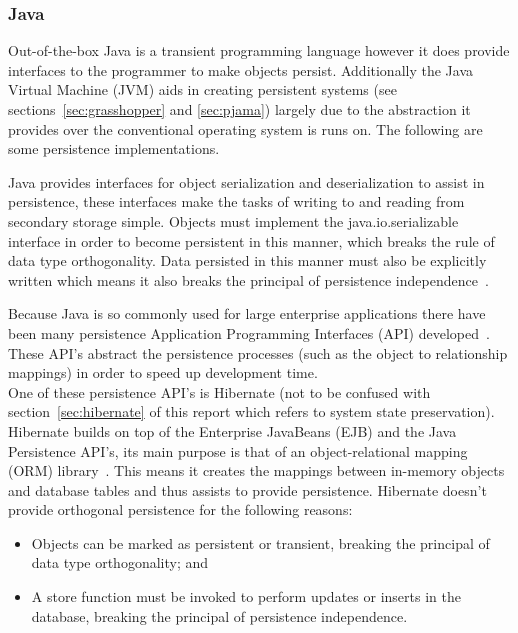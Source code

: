 \documentclass[a4paper,12pt]{article}
\begin{document}
\subsubsection{Java}
Out-of-the-box Java is a transient programming language however it does provide interfaces to the programmer to make objects persist. Additionally the Java Virtual Machine (JVM) aids in creating persistent systems (see sections~\ref{sec:grasshopper} and \ref{sec:pjama}) largely due to the abstraction it provides over the conventional operating system is runs on. The following are some persistence implementations.
\\\par
Java provides interfaces for object serialization and deserialization to assist in persistence, these interfaces make the tasks of writing to and reading from secondary storage simple. Objects must implement the java.io.serializable interface in order to become persistent in this manner, which breaks the rule of data type orthogonality. Data persisted in this manner must also be explicitly written which means it also breaks the principal of persistence independence~\citep{ADearle}.
\\\par
\label{sec:javahibernate}
Because Java is so commonly used for large enterprise applications there have been many persistence Application Programming Interfaces (API) developed~\citep{persistenceandjava}. These API's abstract the persistence processes (such as the object to relationship mappings) in order to speed up development time. 
\\One of these persistence API's is Hibernate (not to be confused with section~\ref{sec:hibernate} of this report which refers to system state preservation). Hibernate builds on top of the Enterprise JavaBeans (EJB) and the Java Persistence API's, its main purpose is that of an object-relational mapping (ORM) library~\citep{hibernateORM}. This means it creates the mappings between in-memory objects and database tables and thus assists to provide persistence. Hibernate doesn't provide orthogonal persistence for the following reasons:
\begin{itemize}
    \item{Objects can be marked as persistent or transient, breaking the principal of data type orthogonality; and}
    \item{A store function must be invoked to perform updates or inserts in the database, breaking the principal of persistence independence.}
\end{itemize}
\end{document}
